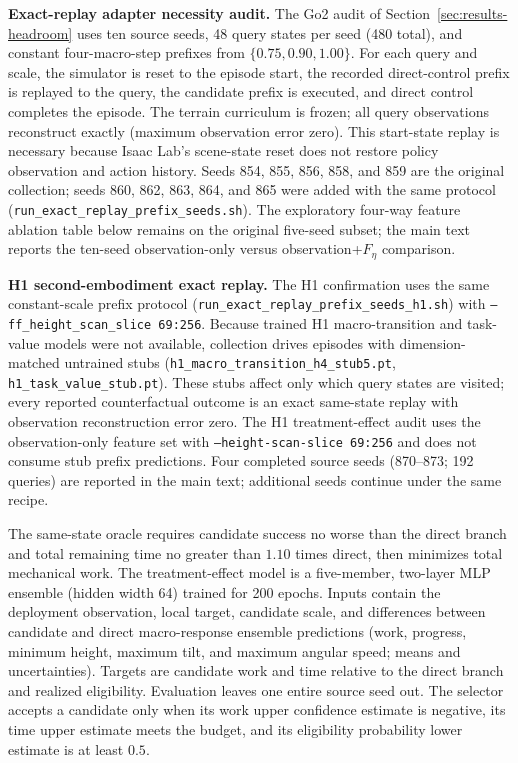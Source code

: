 \textbf{Exact-replay adapter necessity audit.}
The Go2 audit of Section~\ref{sec:results-headroom} uses ten source seeds, 48 query
states per seed (480 total), and constant four-macro-step prefixes from
$\{0.75,0.90,1.00\}$. For each query and scale, the simulator is reset to the
episode start, the recorded direct-control prefix is replayed to the query, the
candidate prefix is executed, and direct control completes the episode. The
terrain curriculum is frozen; all query observations reconstruct exactly
(maximum observation error zero). This start-state replay is necessary because
Isaac Lab's scene-state reset does not restore policy observation and action
history. Seeds 854, 855, 856, 858, and 859 are the original collection; seeds
860, 862, 863, 864, and 865 were added with the same protocol
(\texttt{run\_exact\_replay\_prefix\_seeds.sh}). The exploratory four-way feature
ablation table below remains on the original five-seed subset; the main text
reports the ten-seed observation-only versus observation+$F_\eta$ comparison.

\textbf{H1 second-embodiment exact replay.}
The H1 confirmation uses the same constant-scale prefix protocol
(\texttt{run\_exact\_replay\_prefix\_seeds\_h1.sh}) with
\texttt{--ff\_height\_scan\_slice 69:256}. Because trained H1 macro-transition and
task-value models were not available, collection drives episodes with
dimension-matched untrained stubs
(\texttt{h1\_macro\_transition\_h4\_stub5.pt}, \texttt{h1\_task\_value\_stub.pt}).
These stubs affect only which query states are visited; every reported
counterfactual outcome is an exact same-state replay with observation
reconstruction error zero. The H1 treatment-effect audit uses the observation-only
feature set with \texttt{--height-scan-slice 69:256} and does not consume stub
prefix predictions. Four completed source seeds (870--873; 192 queries) are
reported in the main text; additional seeds continue under the same recipe.

The same-state oracle requires candidate success no worse than the direct branch
and total remaining time no greater than $1.10$ times direct, then minimizes
total mechanical work. The treatment-effect model is a five-member, two-layer
MLP ensemble (hidden width 64) trained for 200 epochs. Inputs contain the
deployment observation, local target, candidate scale, and differences between
candidate and direct macro-response ensemble predictions (work, progress,
minimum height, maximum tilt, and maximum angular speed; means and
uncertainties). Targets are candidate work and time relative to the direct
branch and realized eligibility. Evaluation leaves one entire source seed out.
The selector accepts a candidate only when its work upper confidence estimate is
negative, its time upper estimate meets the budget, and its eligibility
probability lower estimate is at least $0.5$.

